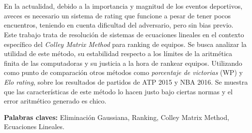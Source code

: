 \section*{\runtitulo}

\noindent En la actualidad, debido a la importancia y magnitud de los eventos deportivos, aveces es necesario un sistema de rating que funcione a pesar de tener pocos encuentros, teniendo en cuenta dificultad del adversario, pero sin bias previo. Este trabajo trata de resolución de sistemas de ecuaciones lineales en el contexto específico del \textit{Colley Matrix Method} para ranking de equipos. 
Se busca analizar la utilidad de este método, su estabilidad respecto a los límites de la aritmética finita de las computadoras y su justicia a la hora de rankear equipos. Utilizando como punto de comparación otros métodos como \textit{porcentaje de victorias} (WP) y \textit{Elo rating}, sobre los resultados de partidos de ATP 2015 y NBA 2016.
Se muestra que las características de este método lo hacen justo bajo ciertas normas y el error aritmético generado es chico.

\bigskip

\noindent\textbf{Palabras claves:} Eliminación Gaussiana, Ranking, Colley Matrix Method, Ecuaciones Lineales.
